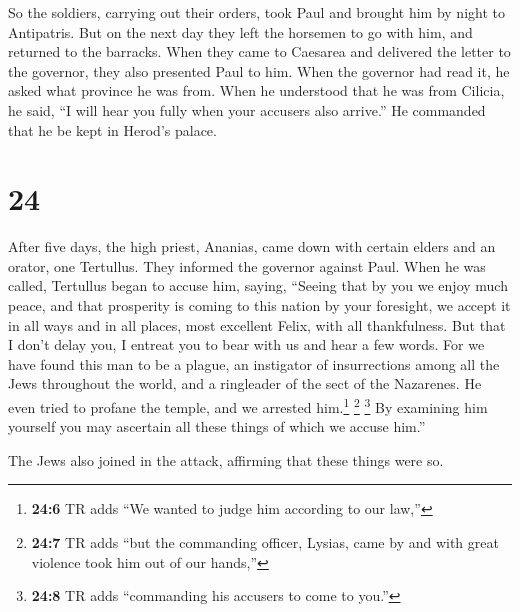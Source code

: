  So the soldiers, carrying out their orders, took Paul
and brought him by night to Antipatris.  But on the next
day they left the horsemen to go with him, and returned to the barracks.
 When they came to Caesarea and delivered the letter to
the governor, they also presented Paul to him.  When the
governor had read it, he asked what province he was from. When he
understood that he was from Cilicia, he said,  ``I will
hear you fully when your accusers also arrive.'' He commanded that he be
kept in Herod's palace.

\hypertarget{section-23}{%
\section{24}\label{section-23}}

 After five days, the high priest, Ananias, came down with
certain elders and an orator, one Tertullus. They informed the governor
against Paul.  When he was called, Tertullus began to
accuse him, saying, ``Seeing that by you we enjoy much peace, and that
prosperity is coming to this nation by your foresight,  we
accept it in all ways and in all places, most excellent Felix, with all
thankfulness.  But that I don't delay you, I entreat you
to bear with us and hear a few words.  For we have found
this man to be a plague, an instigator of insurrections among all the
Jews throughout the world, and a ringleader of the sect of the
Nazarenes.  He even tried to profane the temple, and we
arrested him.\footnote{\textbf{24:6} TR adds ``We wanted to judge him
  according to our law,''}  \footnote{\textbf{24:7} TR
  adds ``but the commanding officer, Lysias, came by and with great
  violence took him out of our hands,''}  \footnote{\textbf{24:8}
  TR adds ``commanding his accusers to come to you.''} By examining him
yourself you may ascertain all these things of which we accuse him.''

 The Jews also joined in the attack, affirming that these
things were so.

